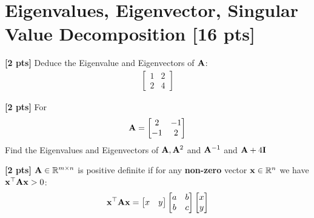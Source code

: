 \documentclass[11pt,addpoints,answers]{exam}
\numberwithin{equation}{section} %
\numberwithin{figure}{section} %
\numberwithin{table}{section} %
\begin{document}
\section{Eigenvalues, Eigenvector, Singular Value Decomposition [16 pts]}
\begin{questions}
    \question \textbf{[2 pts]}  Deduce the Eigenvalue and Eigenvectors of $\mathbf{A}$:
    \begin{align*}
        \begin{bmatrix}
            1 & 2 \\ 2 & 4
        \end{bmatrix}
    \end{align*}
    \begin{tcolorbox}[fit,height=3cm, width=\textwidth, blank, borderline={0.5pt}{-2pt},halign=center, valign=center, nobeforeafter]
    \end{tcolorbox}

    \question \textbf{[2 pts]}   For
    \begin{align*}
         \mathbf{A} = \begin{bmatrix}
             2 & -1 \\ -1 & 2
         \end{bmatrix}
     \end{align*}
     Find the Eigenvalues and Eigenvectors of $\mathbf{A}, \mathbf{A}^2$ and $\mathbf{A}^{-1}$ and $\mathbf{A} + 4\mathbf{I}$

    \begin{tcolorbox}[fit,height=6cm, width=\textwidth, blank, borderline={0.5pt}{-2pt},halign=center, valign=center, nobeforeafter]
    \end{tcolorbox}

    \question \textbf{[2 pts]}  $\mathbf{A} \in \mathbb{R}^{m \times n}$ is positive definite if for any \textbf{non-zero} vector $\mathbf{x} \in \mathbb{R}^{n}$  we have $\mathbf{x}^\top \mathbf{A} \mathbf{x} > 0$:
    \begin{align*}
        \mathbf{x}^\top \mathbf{A} \mathbf{x} = \begin{bmatrix}
            x & y
        \end{bmatrix} \begin{bmatrix}
            a & b \\ b & c
        \end{bmatrix}
        \begin{bmatrix}
            x \\ y
        \end{bmatrix}
    \end{align*}


\end{questions}
\end{document}
